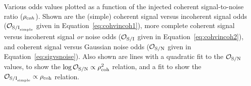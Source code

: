 \label{fig:snrvsodds}
Various odds values plotted as a function of the injected coherent signal-to-noise ratio ($\rho_{\text coh}$).
Shown are the (simple) coherent signal versus incoherent signal odds ($\mathcal{O}_{{\rm S/I}_{\rm simple}}$ given
in Equation~\ref{eq:cohvincoh1}), more complete coherent signal versus incoherent signal {\it or} noise odds
($\mathcal{O}_{\rm S/I}$ given in Equation~\ref{eq:cohvincoh2}), and coherent signal versus Gaussian noise odds
($\mathcal{O}_{\rm S/N}$ given in Equation~\ref{eq:sigvsnoise}). Also shown are lines with a quadratic fit
to the $\mathcal{O}_{\rm S/N}$ values, to show the $\log{\mathcal{O}_{\rm S/N}} \propto \rho_{\text{coh}}^2$ relation,
and a fit to show the $\mathcal{O}_{{\rm S/I}_{\rm simple}} \propto \rho_{\text{coh}}$ relation.
